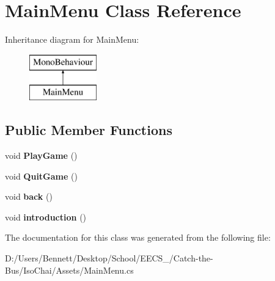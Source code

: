 \hypertarget{class_main_menu}{}\section{Main\+Menu Class Reference}
\label{class_main_menu}
Inheritance diagram for Main\+Menu\+:\begin{figure}[H]
\begin{center}
\leavevmode
\includegraphics[height=2.000000cm]{class_main_menu}
\end{center}
\end{figure}
\subsection*{Public Member Functions}
\begin{DoxyCompactItemize}
\item 
\mbox{\label{class_main_menu_a11d7e3cd6b90cf59659e03e830e02db5}} 
void {\bfseries Play\+Game} ()
\item 
\mbox{\label{class_main_menu_a485db7cf60c0b93ecc87b9273bcce78b}} 
void {\bfseries Quit\+Game} ()
\item 
\mbox{\label{class_main_menu_aa55b12e0fdc8fcade0a1897538d28c3b}} 
void {\bfseries back} ()
\item 
\mbox{\label{class_main_menu_aa4e726a44fb975bf9bd205b9aff3b453}} 
void {\bfseries introduction} ()
\end{DoxyCompactItemize}


The documentation for this class was generated from the following file\+:\begin{DoxyCompactItemize}
\item 
D\+:/\+Users/\+Bennett/\+Desktop/\+School/\+E\+E\+C\+S\+\_/\+Catch-\/the-\/\+Bus/\+Iso\+Chai/\+Assets/Main\+Menu.\+cs\end{DoxyCompactItemize}
